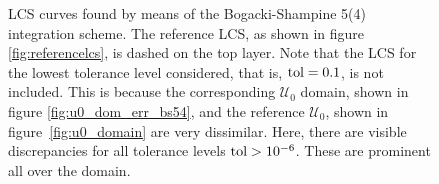 \begin{figure}[htpb]
    \centering
    
    \caption[LCS curves found by means of the Bogacki-Shampine 5(4) integration
    scheme]{
        LCS curves found by means of the Bogacki-Shampine 5(4) integration
        scheme. The reference LCS, as shown in figure
        \ref{fig:referencelcs}, is dashed on the top layer. Note that
        the LCS for the lowest tolerance level considered, that is,
        $\textnormal{tol}=0.1$, is not included. This is because the
        corresponding $\mathcal{U}_{0}$ domain, shown in figure
        \ref{fig:u0_dom_err_bs54}, and the reference $\mathcal{U}_{0}$, shown
        in figure~\ref{fig:u0_domain} are very dissimilar. Here, there are visible
        discrepancies for all tolerance levels $\textnormal{tol}>10^{-6}$.
        These are prominent all over the domain.}
    \label{fig:lcs_rkbs54}
\end{figure}
